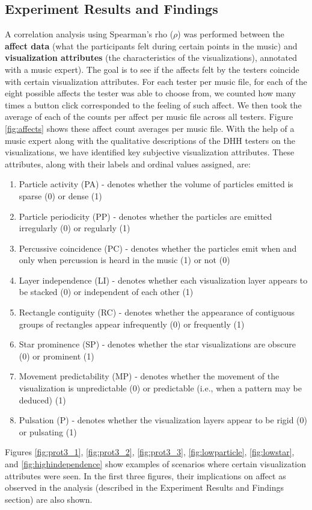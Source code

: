 \documentclass{sigchi-ext}
\begin{document}
\subsection{Experiment Results and Findings}
A correlation analysis using Spearman's rho ($\rho$) was performed between the \textbf{affect data} (what the participants felt during certain points in the music) and \textbf{visualization attributes} (the characteristics of the visualizations), annotated with a music expert). The goal is to see if the affects felt by the testers coincide with certain visualization attributes. For each tester per music file, for each of the eight possible affects the tester was able to choose from, we counted how many times a button click corresponded to the feeling of such affect. We then took the average of each of the counts per affect per music file across all testers. Figure \ref{fig:affects} shows these affect count averages per music file.%
With the help of a music expert along with the qualitative descriptions of the DHH testers on the visualizations, we have identified key subjective visualization attributes. These attributes, along with their labels and ordinal values assigned, are:
\begin{enumerate}
    \item Particle activity (PA) - denotes whether the volume of particles emitted is sparse (0) or dense (1)
    \item Particle periodicity (PP) - denotes whether the particles are emitted irregularly (0) or regularly (1)
    \item Percussive coincidence (PC) - denotes whether the particles emit when and only when percussion is heard in the music (1) or not (0)
    \item Layer independence (LI) - denotes whether each visualization layer appears to be stacked (0) or independent of each other (1)
    \item Rectangle contiguity (RC) - denotes whether the appearance of contiguous groups of rectangles appear infrequently (0) or frequently (1)
    \item Star prominence (SP) - denotes whether the star visualizations are obscure (0) or prominent (1)
    \item Movement predictability (MP) - denotes whether the movement of the visualization is unpredictable (0) or predictable (i.e., when a pattern may be deduced) (1)
    \item Pulsation (P) - denotes whether the visualization layers appear to be rigid (0) or pulsating (1)
\end{enumerate}
Figures \ref{fig:prot3_1}, \ref{fig:prot3_2}, \ref{fig:prot3_3}, \ref{fig:lowparticle}, \ref{fig:lowstar}, and \ref{fig:highindependence} show examples of scenarios where certain visualization attributes were seen. In the first three figures, their implications on affect as observed in the analysis (described in the Experiment Results and Findings section) are also shown.
\end{document}
